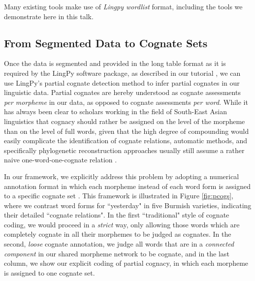 \documentclass[xetex,svgnames]{scrartcl}
\begin{document}
Many existing tools make use of \textit{Lingpy wordlist} format, including the tools we demonstrate here in this talk.

\subsection{From Segmented Data to Cognate Sets}\label{sec:pcogs}

Once the data is segmented and provided in the long table format as it is required by the LingPy
software package, as described in our tutorial \citep{List2018f}, we can use LingPy's partial
cognate detection method to infer partial cognates in our linguistic data. Partial cognates are
hereby understood as cognate assessments \emph{per morpheme} in our data, as opposed to cognate
assessments \emph{per word}. 
While it has always been clear to scholars working in the field of South-East Asian linguistics that
cognacy should rather be assigned on the level of the morpheme than on the level of full words,
given that the high degree of compounding would easily complicate the identification of cognate
relations, automatic methods, and specifically phylogenetic reconstruction approaches usually still
assume a rather naive one-word-one-cognate relation \citep{List2016f}. 

In our framework, we explicitly address this problem by adopting a numerical annotation format in
which each morpheme instead of each word form is assigned to a specific cognate set
\citep{Hill2017a}. This framework is illustrated in Figure \ref{fig:pcogs}, where we contrast word
forms for ``yesterday" in five Burmish varieties, indicating their detailed ``cognate relations". 
In the first ``traditional" style of cognate coding, we would proceed in a \emph{strict} way, only
allowing those words which are completely cognate in all their morphemes to be judged as cognates.
In the second, \emph{loose} cognate annotation, we judge all words that are in a \emph{connected
component} in our shared morpheme network to be cognate, and in the last column, we show our
explicit coding of partial cognacy, in which each morpheme is assigned to one cognate set.
\end{document}
